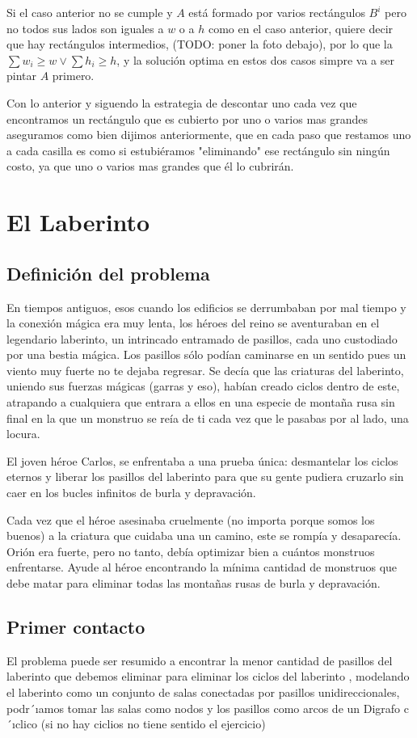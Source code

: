 \documentclass{article}
\begin{document}
   Si el caso anterior no se cumple y $A$ está formado por varios rectángulos $B^{i}$ pero no todos sus lados son iguales a $w$ o a $h$ como en el caso anterior, quiere decir que hay rectángulos intermedios, (TODO: poner la foto debajo), por lo que la $\sum{w_i} \geq w \lor \sum{h_i} \geq h$, y la solución optima en estos dos casos simpre va a ser pintar $A$ primero.

 Con lo anterior y siguendo la estrategia de descontar uno cada vez que encontramos un rectángulo que es cubierto por uno o varios mas grandes aseguramos como bien dijimos anteriormente, que en cada paso que restamos uno a cada casilla es como si estubiéramos "eliminando" ese rectángulo sin ningún costo, ya que uno o varios mas grandes que él lo cubrirán.
\section{El Laberinto}
	\subsection{Definición del problema}
	En tiempos antiguos, esos cuando los edificios se derrumbaban por mal tiempo y la conexión mágica era muy lenta, los héroes del reino se aventuraban en el legendario laberinto, un intrincado entramado de pasillos, cada uno custodiado por una bestia mágica. Los pasillos sólo podían caminarse en un sentido pues un viento muy fuerte no te dejaba regresar. Se decía que las criaturas del laberinto, uniendo sus fuerzas mágicas (garras y eso), habían creado ciclos dentro de este, atrapando a cualquiera que entrara a ellos en una especie de montaña rusa sin final en la que un monstruo se reía de ti cada vez que le pasabas por al lado, una locura.

El joven héroe Carlos, se enfrentaba a una prueba única: desmantelar los ciclos eternos y liberar los pasillos del laberinto para que su gente pudiera cruzarlo sin caer en los bucles infinitos de burla y depravación.

Cada vez que el héroe asesinaba cruelmente (no importa porque somos los buenos) a la criatura que cuidaba una un camino, este se rompía y desaparecía. Orión era fuerte, pero no tanto, debía optimizar bien a cuántos monstruos enfrentarse. Ayude al héroe encontrando la mínima cantidad de monstruos que debe matar para eliminar todas las montañas rusas de burla y depravación.
	\subsection{Primer contacto}
	El problema puede ser resumido a encontrar la menor cantidad de pasillos del
laberinto que debemos eliminar para eliminar los ciclos del laberinto , modelando el laberinto como un conjunto de salas conectadas por pasillos unidireccionales, podr´ıamos tomar las salas como nodos y los pasillos como arcos de un Digrafo c´ıclico (si no hay ciclios no tiene sentido el ejercicio)
\end{document}
